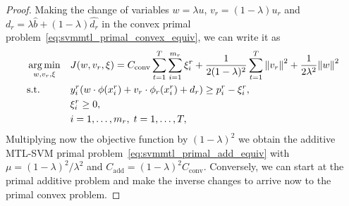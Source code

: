 \begin{proof}
    Making the change of variables $w = \lambda u$, $v_r = (1 - \lambda)u_r$ and $d_r = \lambda \hat{b} + (1 - \lambda) \hat{d_r}$ in the convex primal problem~\eqref{eq:svmmtl_primal_convex_equiv}, we can write it as 
        \begin{equation*}
            \begin{aligned}
            & \operatorname*{arg\min}_{w, v_r, \xi}
            & & {J(w, v_r, \xi) = C_\text{conv} \sum_{t= 1}^T \sum_{i=1}^{m_r}{\xi_{i}^r} + \frac{1}{2 (1-\lambda)^2} \sum_{t= 1}^T{\left\lVert v_r\right\rVert^2} + \frac{1}{2 \lambda^2} {\left\lVert w\right\rVert}^2} \\
            & \text{s.t.}
            & & y_{i}^r (w \cdot \phi(x_{i}^r)  + v_r \cdot \phi_r(x_{i}^r) + d_r) \geq p_{i}^r - \xi_{i}^r , \\
            & & & \xi_{i}^r \geq 0,  \\
            & & & i=1,\dotsc,m_r, \;  t= 1,\dotsc,T ,
            \end{aligned}
        \end{equation*}
    Multiplying now the objective function by $(1 - \lambda)^2$ we obtain the additive MTL-SVM primal problem~\eqref{eq:svmmtl_primal_add_equiv} with $\mu =(1 - \lambda)^2 / \lambda^2$ and $C_\text{add} = (1-\lambda)^2 C_\text{conv}$.
    Conversely, we can start at the primal additive problem and make the inverse changes to arrive now to the primal convex problem.
\end{proof}

